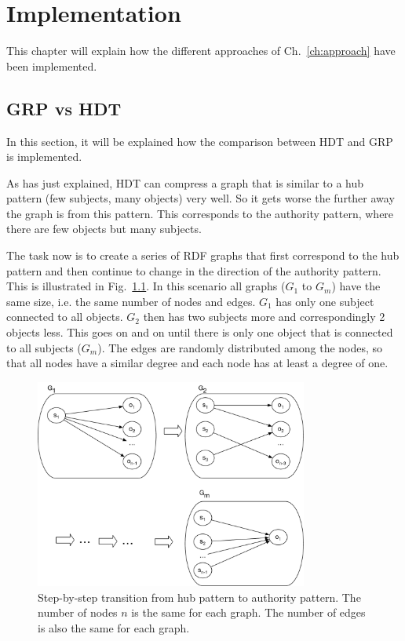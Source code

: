 \chapter{Implementation}\label{ch:implementation}

This chapter will explain how the different approaches of Ch.~\ref{ch:approach} have been implemented.

\section{GRP vs HDT}\label{sec:implementationGRPvsHDT}

In this section, it will be explained how the comparison between HDT and GRP is implemented.

As has just explained, HDT can compress a graph that is similar to a hub pattern (few subjects, many objects) very well. So it gets worse the further away the graph is from this pattern. This corresponds to the authority pattern, where there are few objects but many subjects.

The task now is to create a series of RDF graphs that first correspond to the hub pattern and then continue to change in the direction of the authority pattern. This is illustrated in Fig.~\ref{fig:star_pattern}. In this scenario all graphs ($G_1$ to $G_m$) have the same size, i.e. the same number of nodes and edges. $G_1$ has only one subject connected to all objects. $G_2$ then has two subjects more and correspondingly 2 objects less. This goes on and on until there is only one object that is connected to all subjects ($G_m$). The edges are randomly distributed among the nodes, so that all nodes have a similar degree and each node has at least a degree of one.

\begin{figure}[h]
	\centering
	\includegraphics[width=0.8\textwidth]{figures/GRPvsHDT/starpattern.pdf}
	\caption{Step-by-step transition from hub pattern to authority pattern. The number of nodes $n$ is the same for each graph. The number of edges is also the same for each graph.}
	\label{fig:star_pattern}
\end{figure}

